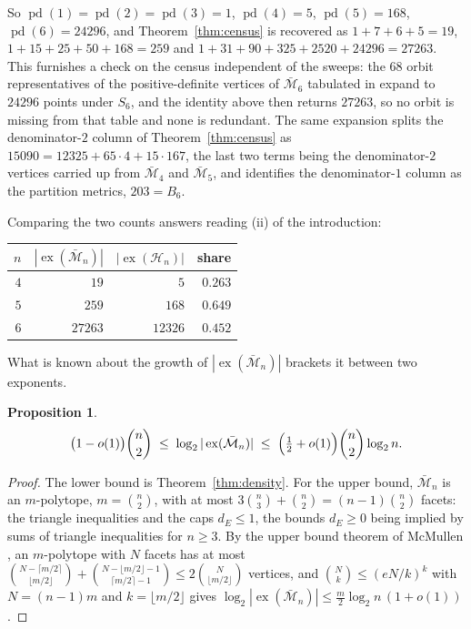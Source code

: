 \documentclass[11pt]{article}
\newtheorem{proposition}[theorem]{Proposition}
\theoremstyle{definition}
\theoremstyle{remark}
\newcommand{\bM}{\bar{\mathcal{M}}}
\newcommand{\Ha}{\mathcal{H}}
\newcommand{\ex}{\operatorname{ex}}
\begin{document}
So $\operatorname{pd}(1)=\operatorname{pd}(2)=\operatorname{pd}(3)=1$,
$\operatorname{pd}(4)=5$, $\operatorname{pd}(5)=168$, $\operatorname{pd}(6)=24296$, and
Theorem~\ref{thm:census} is recovered as $1+7+6+5=19$, $1+15+25+50+168=259$ and
$1+31+90+325+2520+24296=27263$. This furnishes a check on the census independent of the
sweeps: the $68$ orbit representatives of the positive-definite vertices of $\bM_6$
tabulated in \cite[\S5.1]{Kehoe19} expand to $24296$ points under $S_6$, and the identity
above then returns $27263$, so no orbit is missing from that table and none is redundant.
The same expansion splits the denominator-$2$ column of Theorem~\ref{thm:census} as
$15090=12325+65\cdot4+15\cdot167$, the last two terms being the denominator-$2$ vertices
carried up from $\bM_4$ and $\bM_5$, and identifies the denominator-$1$ column as the
partition metrics, $203=B_6$.

Comparing the two counts answers reading (ii) of the introduction:

\begin{center}
\begin{tabular}{r|r|r|r}
$n$ & $|\ex(\bM_n)|$ & $|\ex(\Ha_n)|$ & share\\
\hline
$4$ & $19$ & $5$ & $0.263$\\
$5$ & $259$ & $168$ & $0.649$\\
$6$ & $27263$ & $12326$ & $0.452$
\end{tabular}
\end{center}

What is known about the growth of $|\ex(\bM_n)|$ brackets it between two exponents.

\begin{proposition}\label{prop:ubt}
\[
\bigl(1-o(1)\bigr)\binom n2\;\leq\;\log_2|\ex(\bM_n)|\;\leq\;
\Bigl(\tfrac12+o(1)\Bigr)\binom n2\log_2 n .
\]
\end{proposition}

\begin{proof}
The lower bound is Theorem~\ref{thm:density}. For the upper bound, $\bM_n$ is an
$m$-polytope, $m=\binom n2$, with at most $3\binom n3+\binom n2=(n-1)\binom n2$ facets:
the triangle inequalities and the caps $d_E\leq1$, the bounds $d_E\geq0$ being implied by
sums of triangle inequalities for $n\geq3$. By the upper bound theorem of McMullen
\cite{McMullen70}, an $m$-polytope with $N$ facets has at most
$\binom{N-\lceil m/2\rceil}{\lfloor m/2\rfloor}
+\binom{N-\lfloor m/2\rfloor-1}{\lceil m/2\rceil-1}\leq2\binom{N}{\lfloor m/2\rfloor}$
vertices, and $\binom Nk\leq(eN/k)^k$ with $N=(n-1)m$ and $k=\lfloor m/2\rfloor$ gives
$\log_2|\ex(\bM_n)|\leq\tfrac m2\log_2 n\,(1+o(1))$.
\end{proof}
\end{document}
